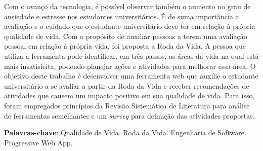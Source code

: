 \begin{resumo}
Com o avanço da tecnologia, é possível observar também o aumento no grau de ansiedade e estresse nos estudantes universitários. É de suma importância a avaliação e o cuidado que o estudante universitário deve ter em relação à própria qualidade de vida. Com o propósito de auxiliar pessoas a terem uma avaliação pessoal em relação à própria vida, foi proposta a Roda da Vida. A pessoa que utiliza a ferramenta pode identificar, em três passos, as áreas da vida na qual está mais insatisfeita, podendo planejar ações e atividades para melhorar essa área. O objetivo deste trabalho é desenvolver uma ferramenta web que auxilie o estudante universitário a se avaliar a partir da Roda da Vida e receber recomendações de atividades que causem um impacto positivo em sua qualidade de vida. Para isso, foram empregados princípios da Revisão Sistemática de Literatura para análise de ferramentas semelhantes e um \textit{survey} para definição das atividades propostas.

 \vspace{\onelineskip}

 \noindent
 \textbf{Palavras-chave}: Qualidade de Vida. Roda da Vida. Engenharia de Software. Progressive Web App.
\end{resumo}
